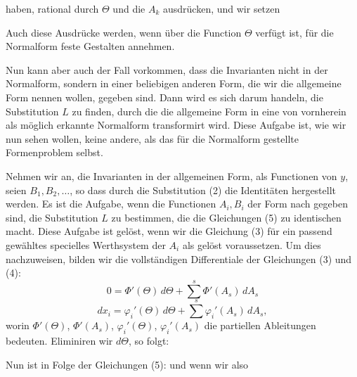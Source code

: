

haben, rational durch $\Theta$ und die $A_k$ ausdrücken, und wir setzen

Auch diese Ausdrücke werden, wenn über die Function $\Theta$ verfügt ist, für die Normalform feste Gestalten annehmen.

Nun kann aber auch der Fall vorkommen, dass die Invarianten nicht in der Normalform, sondern in einer beliebigen anderen Form, die wir die allgemeine Form nennen wollen, gegeben sind. Dann wird es sich darum handeln, die Substitution $L$ zu finden, durch die die allgemeine Form in eine von vornherein als möglich erkannte Normalform transformirt wird. Diese Aufgabe ist, wie wir nun sehen wollen, keine andere, als das für die Normalform gestellte Formenproblem selbst.

Nehmen wir an, die Invarianten in der allgemeinen Form, als Functionen von $y$, seien $B_1, B_2, \ldots$, so dass durch die Substitution (2) die Identitäten
hergestellt werden. Es ist die Aufgabe, wenn die Functionen $A_i, B_i$ der Form nach gegeben sind, die Substitution $L$ zu bestimmen, die die Gleichungen (5) zu identischen macht. Diese Aufgabe ist gelöst, wenn wir die Gleichung (3) für ein passend gewähltes specielles Werthsystem der $A_i$ als gelöst voraussetzen. Um dies nachzuweisen, bilden wir die vollständigen Differentiale der Gleichungen (3) und (4):
\[
0 = \Phi'(\Theta)\,d\Theta + \sum^s \Phi'(A_s)\,dA_s
\]
\[
dx_i = \varphi_i'(\Theta)\,d\Theta + \sum^s \varphi_i'(A_s)\,dA_s,
\]
worin $\Phi'(\Theta)$, $\Phi'(A_s)$, $\varphi_i'(\Theta)$, $\varphi_i'(A_s)$ die partiellen Ableitungen bedeuten. Eliminiren wir $d\Theta$, so folgt:

Nun ist in Folge der Gleichungen (5):
und wenn wir also
